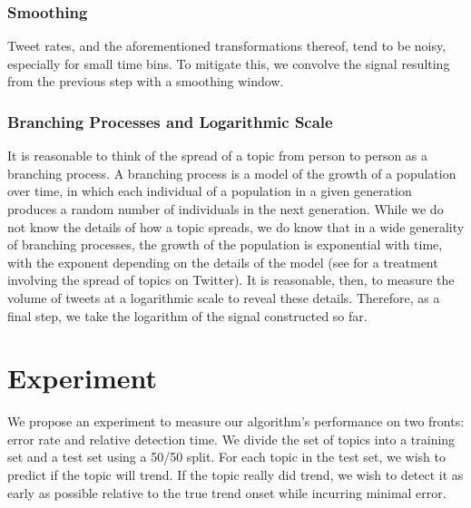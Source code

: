 \subsubsection{Smoothing}
Tweet rates, and the aforementioned transformations thereof, tend to be noisy,
especially for small time bins. To mitigate this, we convolve the signal
resulting from the previous step with a smoothing window.

\subsubsection{Branching Processes and Logarithmic Scale}
It is reasonable to think of the spread of a topic from person to person as a
branching process. A branching process is a model of the growth of a population
over time, in which each individual of a population in a given generation
produces a random number of individuals in the next generation. While we do not
know the details of how a topic spreads, we do know that in a wide generality of
branching processes, the growth of the population is exponential with time, with
the exponent depending on the details of the model \cite{AthreyaNey} (see
\cite{Szabo} for a treatment involving the spread of topics on Twitter). It is
reasonable, then, to measure the volume of tweets at a logarithmic scale to
reveal these details. Therefore, as a final step, we take the logarithm of the
signal constructed so far.

\section{Experiment}
We propose an experiment to measure our algorithm's performance on two fronts:
error rate and relative detection time. We divide the set of topics into a
training set and a test set using a 50/50 split. For each topic in the test
set, we wish to predict if the topic will trend. If the topic really did trend,
we wish to detect it as early as possible relative to the true trend onset while
incurring minimal error.

